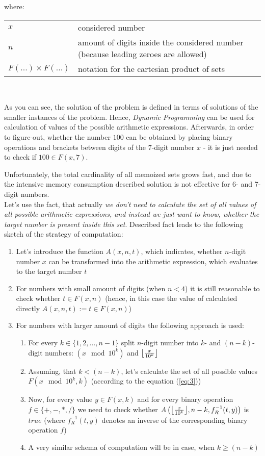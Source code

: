 \documentclass{article}
\makeatletter
\newenvironment{conditions}[1][where:]
  {#1 \begin{tabular}[t]{>{$}l<{$} @{${} - {}$} l}}
  {\end{tabular}\\[\belowdisplayskip]}
\DeclarePairedDelimiter\floor{\lfloor}{\rfloor}
\makeatother
\begin{document}
\begin{conditions} 
	x & considered number \\
	n & amount of digits inside the considered number (because leading zeroes are allowed) \\
	F(...) \times F(...) & notation for the cartesian product of sets
\end{conditions} 

As you can see, the solution of the problem is defined in terms of solutions of the smaller instances of the problem. Hence, \textit{Dynamic Programming} can be used for calculation of values of the possible arithmetic expressions. Afterwards, in order to figure-out, whether the number $100$ can be obtained by placing binary operations and brackets between digits of the 7-digit number $x$ - it is just needed to check if $100 \in F(x, 7)$.

Unfortunately, the total cardinality of all memoized sets grows fast, and due to the intensive memory consumption described solution is not effective for 6- and 7- digit numbers. \\

Let's use the fact, that actually \textit{we don't need to calculate the set of all values of all possible arithmetic expressions, and instead we just want to know, whether the target number is present inside this set}.
Described fact leads to the following sketch of the strategy of computation: 

\begin{enumerate}
	\item Let's introduce the function $A(x, n, t)$, which indicates, whether $n$-digit number $x$ can be transformed into the arithmetic expression, which evaluates to the target number $t$
	\item For numbers with small amount of digits (when $n < 4$) it is still reasonable to check whether $t \in F(x, n)$ (hence, in this case the value of calculated directly $A(x, n, t) := t \in F(x, n)$)
	\item For numbers with larger amount of digits the following approach is used:
	\begin{enumerate}
		\item For every $k \in \{1, 2, ..., n-1\}$ split $n$-digit number into $k$- and $(n-k)$- digit numbers: $(x \mod 10^k)$ and $\floor*{x \over 10^k}$
		\item Assuming, that $k < (n - k)$, let's calculate the set of all possible values $F\left(x \mod 10^k, k\right)$ (according to the equation (\ref{eq:3}))
		\item Now, for every value $y \in F(x, k)$ and for every binary operation $f \in \{+, -, *, /\}$ we need to check whether $A\left(\floor*{x \over 10^k}, n - k, f_R^{-1}(t, y)\right)$ is $true$ (where $f_R^{-1}(t, y)$ denotes an inverse of the corresponding binary operation $f$)
		\item A very similar schema of computation will be in case, when $k \geq (n - k)$
	\end{enumerate}
\end{enumerate}
\end{document}
